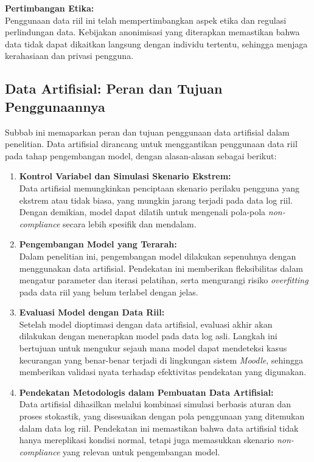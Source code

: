 \textbf{Pertimbangan Etika:} \\
Penggunaan data riil ini telah mempertimbangkan aspek etika dan regulasi perlindungan data. Kebijakan anonimisasi yang diterapkan memastikan bahwa data tidak dapat dikaitkan langsung dengan individu tertentu, sehingga menjaga kerahasiaan dan privasi pengguna.

\subsection{Data Artifisial: Peran dan Tujuan Penggunaannya}
\label{sec:dataArtifisial}
Subbab ini memaparkan peran dan tujuan penggunaan data artifisial dalam penelitian. Data artifisial dirancang untuk menggantikan penggunaan data riil pada tahap pengembangan model, dengan alasan-alasan sebagai berikut:

\begin{enumerate}
    \item \textbf{Kontrol Variabel dan Simulasi Skenario Ekstrem:} \\
    Data artifisial memungkinkan penciptaan skenario perilaku pengguna yang ekstrem atau tidak biasa, yang mungkin jarang terjadi pada data log riil. Dengan demikian, model dapat dilatih untuk mengenali pola-pola \textit{non-compliance} secara lebih spesifik dan mendalam.
    
    \item \textbf{Pengembangan Model yang Terarah:} \\
    Dalam penelitian ini, pengembangan model dilakukan sepenuhnya dengan menggunakan data artifisial. Pendekatan ini memberikan fleksibilitas dalam mengatur parameter dan iterasi pelatihan, serta mengurangi risiko \textit{overfitting} pada data riil yang belum terlabel dengan jelas.
    
    \item \textbf{Evaluasi Model dengan Data Riil:} \\
    Setelah model dioptimasi dengan data artifisial, evaluasi akhir akan dilakukan dengan menerapkan model pada data log asli. Langkah ini bertujuan untuk mengukur sejauh mana model dapat mendeteksi kasus kecurangan yang benar-benar terjadi di lingkungan sistem \textit{Moodle}, sehingga memberikan validasi nyata terhadap efektivitas pendekatan yang digunakan.
    
    \item \textbf{Pendekatan Metodologis dalam Pembuatan Data Artifisial:} \\
    Data artifisial dihasilkan melalui kombinasi simulasi berbasis aturan dan proses stokastik, yang disesuaikan dengan pola penggunaan yang ditemukan dalam data log riil. Pendekatan ini memastikan bahwa data artifisial tidak hanya mereplikasi kondisi normal, tetapi juga memasukkan skenario \textit{non-compliance} yang relevan untuk pengembangan model.
\end{enumerate}

